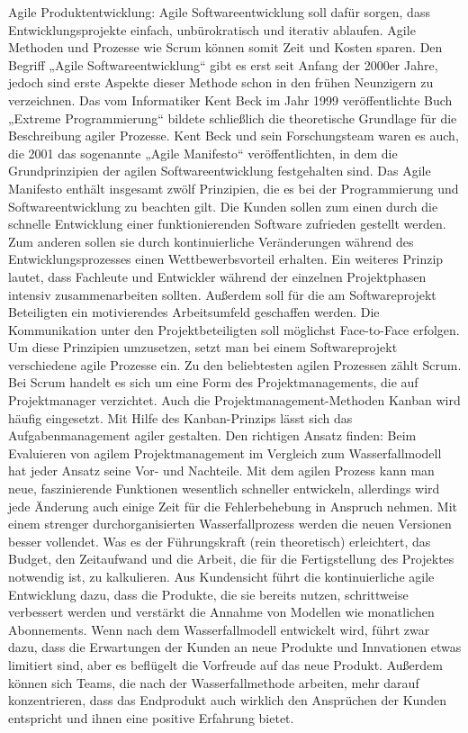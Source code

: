 Agile Produktentwicklung:
Agile Softwareentwicklung soll dafür sorgen, dass Entwicklungsprojekte einfach, unbürokratisch und iterativ ablaufen. Agile Methoden und Prozesse wie Scrum können somit Zeit und Kosten sparen.
Den Begriff „Agile Softwareentwicklung“ gibt es erst seit Anfang der 2000er Jahre, jedoch sind erste Aspekte dieser Methode schon in den frühen Neunzigern zu verzeichnen. Das vom Informatiker Kent Beck im Jahr 1999 veröffentlichte Buch „Extreme Programmierung“ bildete schließlich die theoretische Grundlage für die Beschreibung agiler Prozesse. Kent Beck und sein Forschungsteam waren es auch, die 2001 das sogenannte „Agile Manifesto“ veröffentlichten, in dem die Grundprinzipien der agilen Softwareentwicklung festgehalten sind.
Das Agile Manifesto enthält insgesamt zwölf Prinzipien, die es bei der Programmierung und Softwareentwicklung zu beachten gilt. Die Kunden sollen zum einen durch die schnelle Entwicklung einer funktionierenden Software zufrieden gestellt werden. Zum anderen sollen sie durch kontinuierliche Veränderungen während des Entwicklungsprozesses einen Wettbewerbsvorteil erhalten. Ein weiteres Prinzip lautet, dass Fachleute und Entwickler während der einzelnen Projektphasen intensiv zusammenarbeiten sollten. Außerdem soll für die am Softwareprojekt Beteiligten ein motivierendes Arbeitsumfeld geschaffen werden. Die Kommunikation unter den Projektbeteiligten soll möglichst Face-to-Face erfolgen. Um diese Prinzipien umzusetzen, setzt man bei einem Softwareprojekt verschiedene agile Prozesse ein. Zu den beliebtesten agilen Prozessen zählt Scrum. Bei Scrum handelt es sich um eine Form des Projektmanagements, die auf Projektmanager verzichtet. Auch die Projektmanagement-Methoden Kanban wird häufig eingesetzt. Mit Hilfe des Kanban-Prinzips lässt sich das Aufgabenmanagement agiler gestalten.
Den richtigen Ansatz finden:
Beim Evaluieren von agilem Projektmanagement im Vergleich zum Wasserfallmodell hat jeder Ansatz seine Vor- und Nachteile. Mit dem agilen Prozess kann man neue, faszinierende Funktionen wesentlich schneller entwickeln, allerdings wird jede Änderung auch einige Zeit für die Fehlerbehebung in Anspruch nehmen. Mit einem strenger durchorganisierten Wasserfallprozess werden die neuen Versionen besser vollendet. Was es der Führungskraft (rein theoretisch) erleichtert, das Budget, den Zeitaufwand und die Arbeit, die für die Fertigstellung des Projektes notwendig ist, zu kalkulieren.
Aus Kundensicht führt die kontinuierliche agile Entwicklung dazu, dass die Produkte, die sie bereits nutzen, schrittweise verbessert werden und verstärkt die Annahme von Modellen wie monatlichen Abonnements. Wenn nach dem Wasserfallmodell entwickelt wird, führt zwar dazu, dass die Erwartungen der Kunden an neue Produkte und Innvationen etwas limitiert sind, aber es beflügelt die Vorfreude auf das neue Produkt. Außerdem können sich Teams, die nach der Wasserfallmethode arbeiten, mehr darauf konzentrieren, dass das Endprodukt auch wirklich den Ansprüchen der Kunden entspricht und ihnen eine positive Erfahrung bietet.

